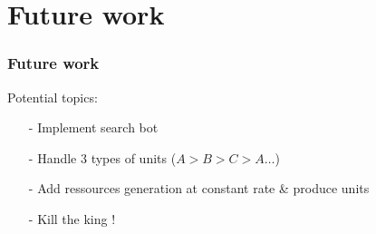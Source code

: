 \documentclass{beamer}
\begin{document}
\section{Future work}

\begin{frame}
\frametitle{Future work}
Potential topics:
\begin{itemize}
\item[-] Implement search bot
\item[-] Handle 3 types of units ($A > B > C > A \dots$)
\item[-] Add ressources generation at constant rate \& produce units
\item[-] Kill the king !
\end{itemize}
\end{frame}
\end{document}
